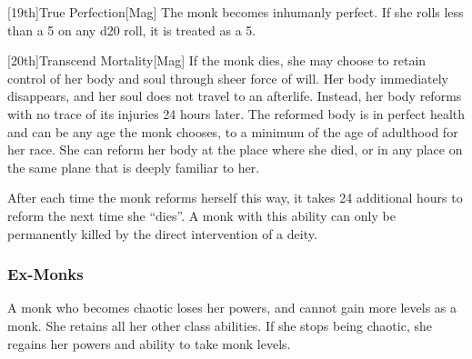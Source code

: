         [19th]{True Perfection}[Mag]
        The monk becomes inhumanly perfect.
        If she rolls less than a 5 on any d20 roll, it is treated as a 5.

        [20th]{Transcend Mortality}[Mag]
        If the monk dies, she may choose to retain control of her body and soul through sheer force of will.
        Her body immediately disappears, and her soul does not travel to an afterlife.
        Instead, her body reforms with no trace of its injuries 24 hours later.
        The reformed body is in perfect health and can be any age the monk chooses, to a minimum of the age of adulthood for her race.
        She can reform her body at the place where she died, or in any place on the same plane that is deeply familiar to her.

        After each time the monk reforms herself this way, it takes 24 additional hours to reform the next time she ``dies''.
        A monk with this ability can only be permanently killed by the direct intervention of a deity.

        \subsubsection{Ex-Monks}
            A monk who becomes chaotic loses her \ki powers, and cannot gain more levels as a monk.
            She retains all her other class abilities.
            If she stops being chaotic, she regains her \ki powers and ability to take monk levels.

